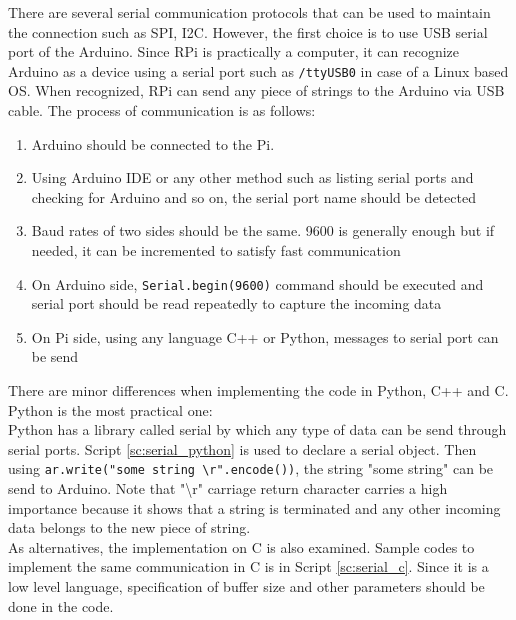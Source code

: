 \documentclass[a4paper,12pt]{article}
\begin{document}
\begin{enumerate}
	There are several serial communication protocols that can be used to maintain the connection such as SPI, I2C. However, the first choice is to use USB serial port of the Arduino. Since RPi is practically a computer, it can recognize Arduino as a device using a serial port such as \lstinline|/ttyUSB0| in case of a Linux based OS. When recognized, RPi can send any piece of strings to the Arduino via USB cable. The process of communication is as follows:
	\begin{enumerate}
		\item Arduino should be connected to the Pi. \vspace{-0.2cm}
		\item Using Arduino IDE or any other method such as listing serial ports and checking for Arduino and so on, the serial port name should be detected \vspace{-0.2cm}
		\item Baud rates of two sides should be the same. 9600 is generally enough but if needed, it can be incremented to satisfy fast communication \vspace{-0.2cm}
		\item On Arduino side, \texttt{Serial.begin(9600)} command should be executed and serial port should be read repeatedly to capture the incoming data \vspace{-0.2cm}
		\item On Pi side, using any language C++ or Python, messages to serial port can be send 
	\end{enumerate}
	
	There are minor differences when implementing the code in Python, C++  and C. Python is the most practical one:\\
	
	Python has a library called serial by which any type of data can be send through serial ports. Script \ref{sc:serial_python} is used to declare a serial object. Then using \texttt{ar.write("some string \textbackslash r".encode())}, the string "some string" can be send to Arduino. Note that "\textbackslash r" carriage return character carries a high importance because it shows that a string is terminated and any other incoming data belongs to the new piece of string.   \\
	

	As alternatives, the implementation on C is also examined.	Sample codes to implement the same communication in C is in Script \ref{sc:serial_c}. Since it is a low level language, specification of buffer size and other parameters should be done in the code.\\


\end{enumerate}
\end{document}
